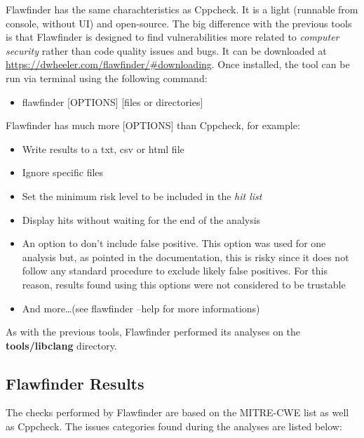 Flawfinder has the same charachteristics as Cppcheck. It is a light (runnable from console, without UI) and open-source.\newline
The big difference with the previous tools is that Flawfinder is designed to find vulnerabilities more related to \textsl{computer security} rather than code quality issues and bugs.\newline
It can be downloaded at \url{https://dwheeler.com/flawfinder/#downloading}.\newline
Once installed, the tool can be run via terminal using the following command:
\begin{itemize}
	\item flawfinder [OPTIONS] [files or directories]
\end{itemize}

Flawfinder has much more [OPTIONS] than Cppcheck, for example:\begin{itemize}
	\item Write results to a txt, csv or html file
	\item Ignore specific files
	\item Set the minimum risk level to be included in the \textsl{hit list}
	\item Display hits without waiting for the end of the analysis
	\item An option to don't include false positive. This option was used for one analysis but, as pointed in the documentation, this is risky since it does not follow any standard procedure to exclude likely false positives. For this reason, results found using this options were not considered to be trustable
	\item And more\dots (see flawfinder --help for more informations)
\end{itemize}

As with the previous tools, Flawfinder performed its analyses on the \textbf{tools/libclang} directory.

\subsection{Flawfinder Results}

The checks performed by Flawfinder are based on the MITRE-CWE list as well as Cppcheck.\newline
The issues categories found during the analyses are listed below:

